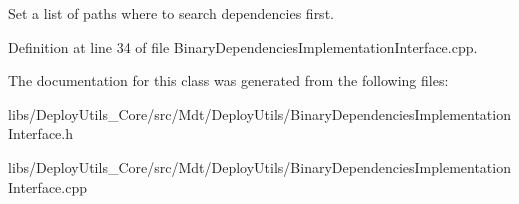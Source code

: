 Set a list of paths where to search dependencies first. 



Definition at line 34 of file Binary\+Dependencies\+Implementation\+Interface.\+cpp.



The documentation for this class was generated from the following files\+:\begin{DoxyCompactItemize}
\item 
libs/\+Deploy\+Utils\+\_\+\+Core/src/\+Mdt/\+Deploy\+Utils/Binary\+Dependencies\+Implementation\+Interface.\+h\item 
libs/\+Deploy\+Utils\+\_\+\+Core/src/\+Mdt/\+Deploy\+Utils/Binary\+Dependencies\+Implementation\+Interface.\+cpp\end{DoxyCompactItemize}

